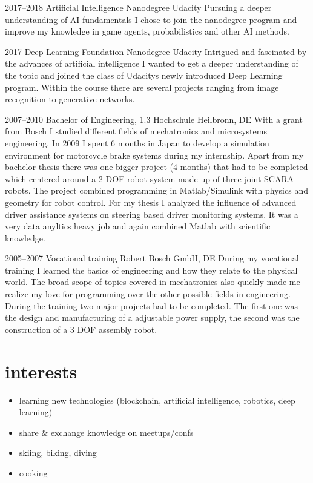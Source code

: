 \documentclass[]{friggeri-cv} %
\begin{document}
\begin{entrylist}

\entry
{2017--2018}
{Artificial Intelligence {\normalfont Nanodegree}}
{Udacity}
{Pursuing a deeper understanding of AI fundamentals I chose to join the nanodegree program and improve my knowledge in game agents, probabilistics and other AI methods.}

\entry
{2017}
{Deep Learning {\normalfont Foundation Nanodegree}}
{Udacity}
{Intrigued and fascinated by the advances of artificial intelligence I wanted to get a deeper understanding of the topic and joined the class of Udacitys newly introduced Deep Learning program. Within the course there are several projects ranging from image recognition to generative networks.}

\entry
{2007--2010}
{Bachelor {\normalfont of Engineering}, 1.3}
{Hochschule Heilbronn, DE}
{With a grant from Bosch I studied different fields of mechatronics and microsystems engineering. In 2009 I spent 6 months in Japan to develop a simulation environment for motorcycle brake systems during my internship. Apart from my bachelor thesis there was one bigger project (4 months) that had to be completed which centered around a 2-DOF robot system made up of three joint SCARA robots. The project combined programming in Matlab/Simulink with physics and geometry for robot control. 
For my thesis I analyzed the influence of advanced driver assistance systems on steering based driver monitoring systems. It was a very data anyltics heavy job and again combined Matlab with scientific knowledge.
}

\entry
{2005--2007}
{Vocational training}
{Robert Bosch GmbH, DE}
{During my vocational training I learned the basics of engineering and how they relate to the physical world. The broad scope of topics covered in mechatronics also quickly made me realize my love for programming over the other possible fields in engineering. During the training two major projects had to be completed. The first one was the design and manufacturing of a adjustable power supply, the second was the construction of a 3 DOF assembly robot.
}
\end{entrylist}


\section{\color{green}interests}
\begin{itemize}
\item learning new technologies (blockchain, artificial intelligence, robotics, deep learning)
\item share \& exchange knowledge on meetups/confs
\item skiing, biking, diving
\item cooking
\end{itemize}

\end{document}
